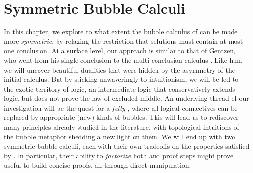 \setchapterpreamble[u]{\margintoc}
\chapter{Symmetric Bubble Calculi}

In this chapter, we explore to what extent the bubble calculus of
 can be made more \emph{symmetric}, by relaxing the restriction
that solutions must contain at most one conclusion. At a surface level, our
approach is similar to that of Gentzen, who went from his single-conclusion
  to the multi-conclusion calculus . Like
him, we will uncover beautiful dualities that were hidden by the asymmetry of
the initial calculus. But by sticking unwaveringly to intuitionism, we will be
led to the exotic territory of  logic, an intermediate
logic that conservatively extends  logic, but does not prove the
law of excluded middle. An underlying thread of our investigation will be the
quest for a \emph{fully } , where all logical connectives
can be replaced by appropriate (new) kinds of bubbles. This will lead us to
rediscover many principles already studied in the 
literature, with topological intuitions of the bubble metaphor shedding a new
light on them. We will end up with two symmetric bubble calculi, each with their
own tradeoffs on the properties satisfied by . In particular,
their ability to \emph{factorize} both  and  proof steps might
prove useful to build concise proofs, all through direct manipulation.

